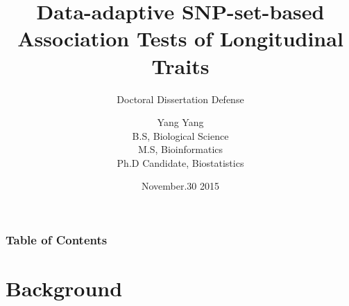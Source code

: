\documentclass[compress]{beamer}
\begin{document}
\title[Doctoral Dissertation Defense] %
{Data-adaptive SNP-set-based Association Tests of Longitudinal Traits}
\subtitle{Doctoral Dissertation Defense}
\author[ Yang Yang] %
{
Yang Yang\\
B.S, Biological Science\\
M.S, Bioinformatics\\
Ph.D Candidate, Biostatistics
}
\date[Nov.30 2015] %
{November.30 2015}


\frame{\titlepage}


\begin{frame}
\frametitle{Table of Contents}
\small
\tableofcontents
\end{frame}


\section{Background}
\end{document}
